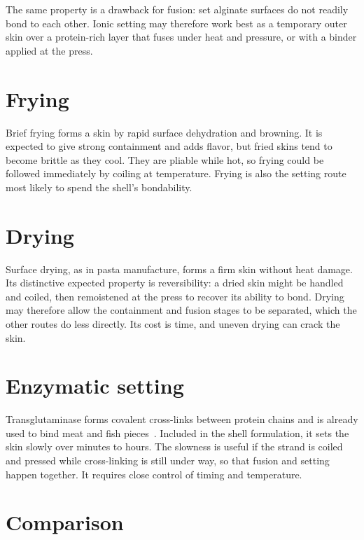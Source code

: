\documentclass[11pt,openany]{book}
\theoremstyle{definition}
\begin{document}
The same property is a drawback for fusion: set alginate surfaces do not readily bond to each other. Ionic setting may therefore work best as a temporary outer skin over a protein-rich layer that fuses under heat and pressure, or with a binder applied at the press.

\section{Frying}

Brief frying forms a skin by rapid surface dehydration and browning. It is expected to give strong containment and adds flavor, but fried skins tend to become brittle as they cool. They are pliable while hot, so frying could be followed immediately by coiling at temperature. Frying is also the setting route most likely to spend the shell's bondability.

\section{Drying}

Surface drying, as in pasta manufacture, forms a firm skin without heat damage. Its distinctive expected property is reversibility: a dried skin might be handled and coiled, then remoistened at the press to recover its ability to bond. Drying may therefore allow the containment and fusion stages to be separated, which the other routes do less directly. Its cost is time, and uneven drying can crack the skin.

\section{Enzymatic setting}

Transglutaminase forms covalent cross-links between protein chains and is already used to bind meat and fish pieces~\cite{kuraishi2001}. Included in the shell formulation, it sets the skin slowly over minutes to hours. The slowness is useful if the strand is coiled and pressed while cross-linking is still under way, so that fusion and setting happen together. It requires close control of timing and temperature.

\section{Comparison}
\end{document}
